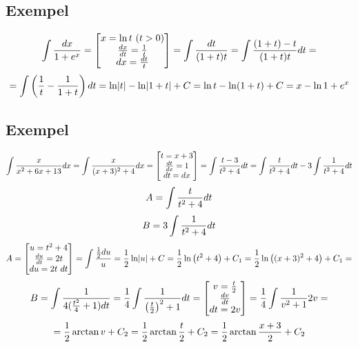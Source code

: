 \documentclass{article}
\begin{document}
\subsection{Exempel}
$$ \int{dx \over 1+e^x} = \bmat{x=\ln t\ (t>0)\\ \f{dx}{dt} = \f 1t \\ dx = \f{dt}t} = \int{dt \over (1+t)t} = \int{\f{(1+t)-t}{(1+t)t}dt}  =$$
$$=\int{\left(\frac{1}{t} - \frac{1}{1+t}\right)dt} = \ln \lvert t\rvert - \ln \lvert1+t\rvert + C = \ln t - \ln (1+t) + C = x - \ln {1+e^x}$$

\subsection{Exempel}
$$ \int{\frac{x}{x^2 + 6x + 13}dx} = \int{\frac{x}{(x+3)^2+4}dx} = \left[\begin{matrix} t=x+3 \\ \frac{dt}{dx} = 1 \\  dt=dx\end{matrix}\right] =\int{\frac{t-3}{t^2+4}dt} = \int{\frac{t}{t^2+4}dt} - 3\int{\frac{1}{t^2+4}dt}$$
$$A = \int{\frac{t}{t^2+4}dt}$$
$$B = 3\int{\frac{1}{t^2+4}dt}$$
$$ A=\left[\begin{matrix}u=t^2+4 \\ \frac{du}{dt} = 2t \\ du=2t\ dt\end{matrix}\right] = \int{\frac{1}{2} du \over u} = \frac{1}{2} \ln \lvert u\rvert + C = \frac{1}{2} \ln\left(t^2+4\right)+C_1 = \frac{1}{2} \ln\left((x+3)^2+4\right) + C_1 =$$
$$ B=\int{\frac{1}{4(\frac{t^2}{4} + 1)dt }= \frac{1}{4} \int{\frac{1}{\left(\frac{t}{2}\right)^2 + 1} dt}} = \left[\begin{matrix}v=\frac{t}{2} \\ \frac{dv}{dt} \\ dt=2v\end{matrix}\right] = \frac{1}{4} \int{\frac{1}{v^2+1} 2v} = $$
$$=\frac{1}{2} \arctan v + C_2 = \frac{1}{2} \arctan \frac{t}{2} + C_2 = \frac{1}{2} \arctan \frac{x+3}{2} + C_2 $$
\end{document}
